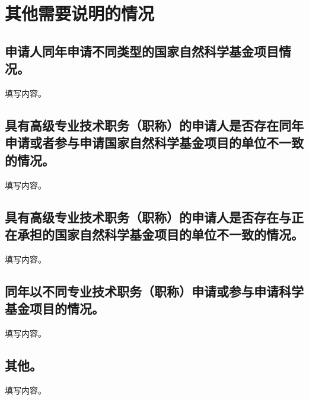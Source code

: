 \par
\chapter{\textbf{其他需要说明的情况}}

\section{申请人同年申请不同类型的国家自然科学基金项目情况。}
填写内容。

\section{具有高级专业技术职务（职称）的申请人是否存在同年申请或者参与申请国家自然科学基金项目的单位不一致的情况。}
填写内容。

\section{具有高级专业技术职务（职称）的申请人是否存在与正在承担的国家自然科学基金项目的单位不一致的情况。}
填写内容。

\section{同年以不同专业技术职务（职称）申请或参与申请科学基金项目的情况。}
填写内容。

\section{其他。}
填写内容。
